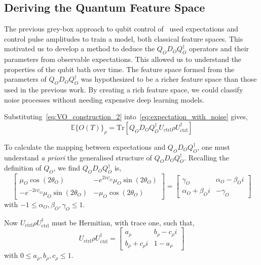 \documentclass[12pt]{iopart}
\begin{document}
\subsection{Deriving the Quantum Feature Space \label{subsec:deducing_noise_operators}}
The previous grey-box approach to qubit control of~\cite{youssry2020characterization,youssry2022multi} used expectations and control pulse amplitudes to train a model, both classical feature spaces. This motivated us to develop a method to deduce the $Q_{O}D_{O}Q_{O}^{\dagger} $ operators and their parameters from observable expectations. This allowed us to understand the properties of the qubit bath over time. The feature space formed from the parameters of $Q_{O}D_{O}Q_{O}^{\dagger}$ was hypothesized to be a richer feature space than those used in the previous work. By creating a rich feature space, we could classify noise processes without needing expensive deep learning models.

Substituting~\cref{eq:VO_construction_2} into~\cref{eq:expectation_with_noise} gives,
\begin{equation}
    \label{eq:expectationWithNoise3}
    \mathbb{E}\{O(T)\}_\rho = \mathrm{Tr}\left[Q_{O}D_{O}Q_{O}^{\dagger} U_{\mathrm{ctrl}} \rho U_{\mathrm{ctrl}}^{\dagger}\right]
\end{equation}

To calculate the mapping between expectations and $Q_{O}D_{O}Q_{O}^{\dagger}$, one must understand \textit{a priori} the generalised structure of $Q_{O}D_{O}Q_{O}^{\dagger}$. Recalling the definition of $Q_O$, we find $ Q_{O}D_{O}Q_{O}^{\dagger}$ is,
\begin{equation}
    \left[ \begin{array}{cc}
            \mu_O\cos(2\theta_O)
             &
            -e^{2i\psi_O}\mu_O\sin(2\theta_O)
            \\
            -e^{-2i\psi_O}\mu_O\sin(2\theta_O)
             &
            -\mu_O\cos(2\theta_O)
        \end{array} \right] = \left[ \begin{array}{cc}
            \gamma_O             & \alpha_O - \beta_O i \\
            \alpha_O + \beta_O i & -\gamma_O
        \end{array} \right]   \label{eq:QDQDagger}
\end{equation}
with $-1 \leq \alpha_O, \beta_O, \gamma_O \leq 1$.

Now $U_{\mathrm{ctrl}} \rho U_{\mathrm{ctrl}}^{\dagger}$ must be Hermitian, with trace one, such that,
\begin{equation}
    U_{\mathrm{ctrl}} \rho U_{\mathrm{ctrl}}^{\dagger} = \left[\begin{array}{cc}
            a_{\rho}             & b_{\rho} - c_{\rho}i \\
            b_{\rho} + c_{\rho}i & 1 - a_{\rho}
        \end{array}\right] \label{eq:uctrl_rho_uctrl_dag}
\end{equation}
with $0 \leq a_{\rho}, b_{\rho}, c_{\rho} \leq 1$.
\end{document}
